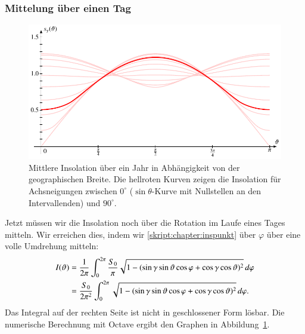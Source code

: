 \subsubsection{Mittelung über einen Tag}
\begin{figure}
\centering
\includegraphics{chapters/5/ell2.pdf}
\caption{Mittlere Insolation über ein Jahr in Abhängigkeit von der
geographischen Breite.
Die hellroten Kurven zeigen die Insolation für Achsneigungen zwischen
$0^\circ$ ($\sin\theta$-Kurve mit Nullstellen an den Intervallenden)
und $90^\circ$.
\label{skript:einstrahlung:jahrinsbild}}
\end{figure}
Jetzt müssen wir die Insolation noch über die Rotation im Laufe eines 
Tages mitteln.
Wir erreichen dies, indem wir \eqref{skript:chapter:inspunkt}
über $\varphi$ über eine volle Umdrehung mitteln:
\begin{align}
I(\vartheta)
&=
\frac{1}{2\pi}
\int_0^{2\pi}
\frac{S_0}{\pi}
\sqrt{1-
(\sin\gamma\sin\vartheta\cos\varphi+\cos\gamma\cos\vartheta)^2}
\,d\varphi
\notag
\\
&=
\frac{S_0}{2\pi^2}
\int_0^{2\pi}
\sqrt{1-
(\sin\gamma\sin\vartheta\cos\varphi+\cos\gamma\cos\vartheta)^2}
\,d\varphi.
\label{skript:einstrahlung:mittlereinsolation}
\end{align}
Das Integral auf der rechten Seite ist nicht in geschlossener
Form lösbar.
Die numerische Berechnung mit Octave ergibt den Graphen
in Abbildung~\ref{skript:einstrahlung:jahrinsbild}.

